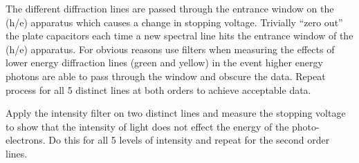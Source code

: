 \documentclass[a4paper, twocolumn]{article}
\begin{document}
The different diffraction lines are passed through the entrance window on the (h/e) apparatus which causes a change in stopping voltage. 
Trivially “zero out” the plate capacitors each time a new spectral line hits the entrance window of the (h/e) apparatus. 
For obvious reasons use filters when measuring the effects of lower energy diffraction lines (green and yellow)  in the event higher
energy photons are able to pass through the window and obscure the data.
Repeat process for all 5 distinct lines at both orders to achieve acceptable data.

Apply the intensity filter on two distinct lines and measure the stopping voltage to show that the intensity of light does
not effect the energy of the photo-electrons. Do this for all 5 levels of intensity and repeat for the second order lines.   
\end{document}

